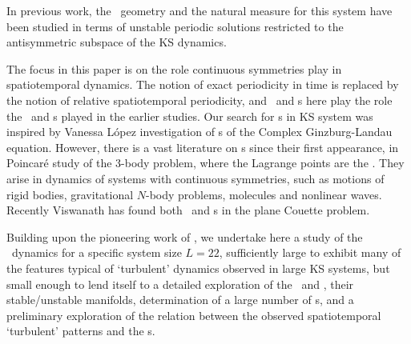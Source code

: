 

In previous work, the \statesp\ geometry and the natural measure for
this system have been
studied in terms of unstable
periodic solutions restricted to the antisymmetric subspace of the
KS dynamics.

The focus in this paper is on the role continuous symmetries
play in spatiotemporal dynamics. The notion of exact
periodicity in time is replaced by the notion of relative
spatiotemporal periodicity, and \reqva\ and \rpo s here play
the role the \eqva\ and \po s played in the earlier studies.
Our search for \rpo s in KS system was inspired by Vanessa
L{\'o}pez investigation of {\rpo s} of the
Complex Ginzburg-Landau equation.  However, there is a vast
literature on {\rpo s} since their first appearance, in
Poincar\'e study of the 3-body problem,
where the Lagrange points are the \reqva.  They arise in
dynamics of systems with continuous symmetries, such as
motions of rigid bodies, gravitational $N$-body problems,
molecules and nonlinear waves.
Recently
Viswanath has found both \reqva\ and \rpo s in
the plane Couette problem.

Building upon the pioneering work of ,
we undertake here
a study of the \KS\ dynamics
for a specific system size $L = 22$, sufficiently large
to exhibit many of the features typical of `turbulent' dynamics
observed in large KS systems, but small enough to lend itself to a
detailed exploration of the  \eqva\ and \reqva,
their stable/unstable manifolds,
determination of a large number of
\rpo s, and a preliminary exploration of the relation between the
observed spatiotemporal `turbulent' patterns and the \rpo s.

